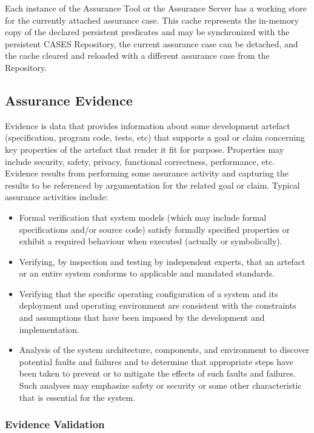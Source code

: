 \documentclass[12pt,twoside,a4paper]{article}
\begin{document}
Each instance of the Assurance Tool or the Assurance Server has a working store for the currently attached assurance case. This cache represents the in-memory copy of the declared persistent predicates and may be synchronized with the persistent CASES Repository, the current assurance case can be detached, and the cache cleared and reloaded with a different assurance case from the Repository.

\hypertarget{assurance-evidence}{%
\subsection{Assurance Evidence}\label{assurance-evidence}}

Evidence is data that provides information about some development artefact (specification, program code, tests, etc) that supports a goal or claim concerning key properties of the artefact that render it fit for purpose. Properties may include security, safety, privacy, functional correctness, performance, etc. Evidence results from performing some assurance activity and capturing the results to be referenced by argumentation for the related goal or claim. Typical assurance activities include:

\begin{itemize}
\item
  Formal verification that system models (which may include formal specifications and/or source code) satisfy formally specified properties or exhibit a required behaviour when executed (actually or symbolically).
\item
  Verifying, by inspection and testing by independent experts, that an artefact or an entire system conforms to applicable and mandated standards.
\item
  Verifying that the specific operating configuration of a system and its deployment and operating environment are consistent with the constraints and assumptions that have been imposed by the development and implementation.
\item
  Analysis of the system architecture, components, and environment to discover potential faults and failures and to determine that appropriate steps have been taken to prevent or to mitigate the effects of such faults and failures. Such analyses may emphasize safety or security or some other characteristic that is essential for the system.
\end{itemize}

\hypertarget{evidence-validation}{%
\subsubsection{Evidence Validation}\label{evidence-validation}}
\end{document}
